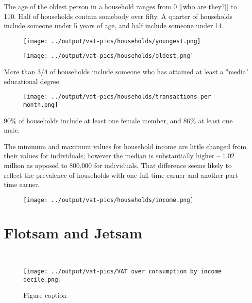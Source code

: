 \documentclass[preprint,12pt]{elsarticle}
\begin{document}
The age of the oldest person in a household ranges from 0 [[who are they?]] to 110. Half of households contain somebody over fifty. A quarter of households include someone under 5 years of age, and half include someone under 14.
\begin{figure}[t]
\centering\texttt{[image: ../output/vat-pics/households/youngest.png]}
\end{figure}
\begin{figure}[t]
\centering\texttt{[image: ../output/vat-pics/households/oldest.png]}
\end{figure}

More than 3/4 of households include someone who has attained at least a "media" educational degree.
\begin{figure}[t]
\centering\texttt{[image: ../output/vat-pics/households/transactions per month.png]}
\end{figure}

90\% of households include at least one female member, and 86\% at least one male.

The minimum and maximum values for household income are little changed from their values for individuals; however the median is substantially higher -- 1.02 million as opposed to 800,000 for individuals. That difference seems likely to reflect the prevalence of households with one full-time earner and another part-time earner.
\begin{figure}[t]
\centering\texttt{[image: ../output/vat-pics/households/income.png]}
\end{figure}





\section{Flotsam and Jetsam}


\\

\begin{figure}[h]
\centering\texttt{[image: ../output/vat-pics/VAT over consumption by income decile.png]}
\caption{Figure caption}
\end{figure}


\\
\end{document}

